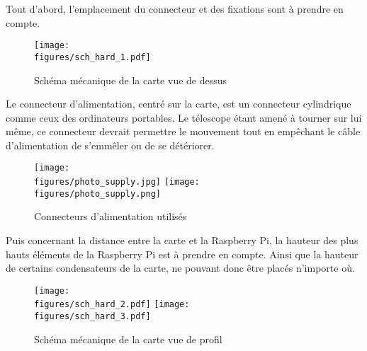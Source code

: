 \vspace{1cm}

Tout d'abord, l'emplacement du connecteur et des fixations sont à prendre en compte.

\begin{figure}[H]
    \centering
    \texttt{[image: \\figures/sch\_hard\_1.pdf]}
    \decoRule
    \caption[
    Schéma mécanique de la carte vue de dessus]{
    Schéma mécanique de la carte vue de dessus}
    \label{fig:Schéma mécanique de la carte vue de dessus}
    \end{figure}

\vspace{1cm}

Le connecteur d'alimentation, centré sur la carte, est un connecteur cylindrique comme ceux des ordinateurs portables. Le télescope étant amené à tourner sur lui même, ce connecteur devrait permettre le mouvement tout en empêchant le câble d'alimentation de s'emmêler ou de se détériorer.

\begin{figure}[H]
    \centering
    \texttt{[image: \\figures/photo\_supply.jpg]}
	\hspace{1cm}
    \texttt{[image: \\figures/photo\_supply.png]}
    \decoRule
    \caption[
    Connecteurs d'alimentation utilisés]{
    Connecteurs d'alimentation utilisés}
    \label{fig:Connecteurs d'alimentation utilisés}
    \end{figure}

\vspace{1cm}

Puis concernant la distance entre la carte et la Raspberry Pi, la hauteur des plus hauts éléments de la Raspberry Pi est à prendre en compte. Ainsi que la hauteur de certains condensateurs de la carte, ne pouvant donc être placés n'importe où.

\begin{figure}[H]
    \centering
    \texttt{[image: \\figures/sch\_hard\_2.pdf]}
    \texttt{[image: \\figures/sch\_hard\_3.pdf]}
    \decoRule
    \caption[
    Schéma mécanique de la carte vue de profil]{
    Schéma mécanique de la carte vue de profil}
    \label{fig:Schéma mécanique de la carte vue de profil}
    \end{figure}

\vspace{1cm}

